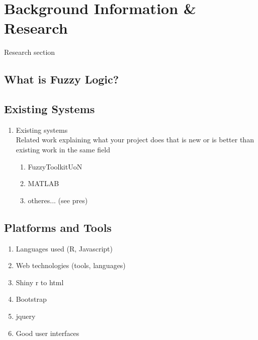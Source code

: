 \section{Background Information \& Research}

{\color{red}Research section}
\subsection{What is Fuzzy Logic?}
\subsection{Existing Systems}
\label{sec:existing-systems}

{\color{red}\begin{enumerate}
\item Existing systems\\
{\color{red} Related work explaining what your project does that is new or is better than existing work in the same field}
	\begin{enumerate}
		\item FuzzyToolkitUoN
		\item MATLAB
		\item otheres... (see pres)
	\end{enumerate}
\end{enumerate}
}

\subsection{Platforms and Tools}
{\color{red}\begin{enumerate}
\item Languages used (R, Javascript)
\item Web technologies (tools, languages)
\item Shiny r to html
\item Bootstrap
\item jquery
\item Good user interfaces
\end{enumerate}}

